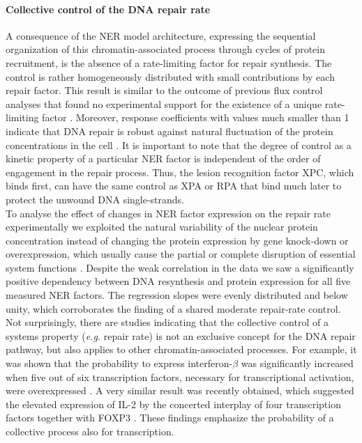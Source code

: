\paragraph{Collective control of the DNA repair rate}
A consequence of the NER model architecture, expressing the sequential organization of this chromatin-associated process through cycles of protein recruitment, is the absence of a rate-limiting factor for repair synthesis. The control is rather homogeneously distributed with small contributions by each repair factor. This result is similar to the outcome of previous flux control analyses that found no experimental support for the existence of a unique rate-limiting factor \cite{Fell1992}. Moreover, response coefficients with values much smaller than 1 indicate that DNA repair is robust  against natural fluctuation of the protein concentrations in the cell \cite{Bluthgen2013}. It is important to note that the degree of control as a kinetic property of a particular NER factor is independent of the order of engagement in the repair process. Thus, the lesion recognition factor XPC, which binds first, can have the same control as XPA or RPA that bind much later to protect the unwound DNA single-strands.\\
To analyse the effect of changes in NER factor expression on the repair rate experimentally we exploited the natural variability of the nuclear protein concentration instead of changing the protein expression by gene knock-down or overexpression, which usually cause the partial or complete disruption of essential system functions \cite{Moriya2006}. Despite the weak correlation in the data we saw a significantly positive dependency between DNA resynthesis and protein expression for all five measured NER factors. The regression slopes were evenly distributed and below unity, which corroborates the finding of a shared moderate repair-rate control.\\  
Not surprisingly, there are studies indicating that the collective control of a systems property (\textit{e.g.} repair rate) is not an exclusive concept for the DNA repair pathway, but also applies to other chromatin-associated processes. For example, it was shown that the probability to express interferon-$\beta$ was significantly increased when five out of six transcription factors, necessary for transcriptional activation, were overexpressed \cite{Apostolou2008}. A very similar result was recently obtained, which suggested the elevated expression of IL-2 by the concerted interplay of four transcription factors together with FOXP3 \cite{Bendfeldt2012}. These findings emphasize the probability of a collective process also for transcription.   



